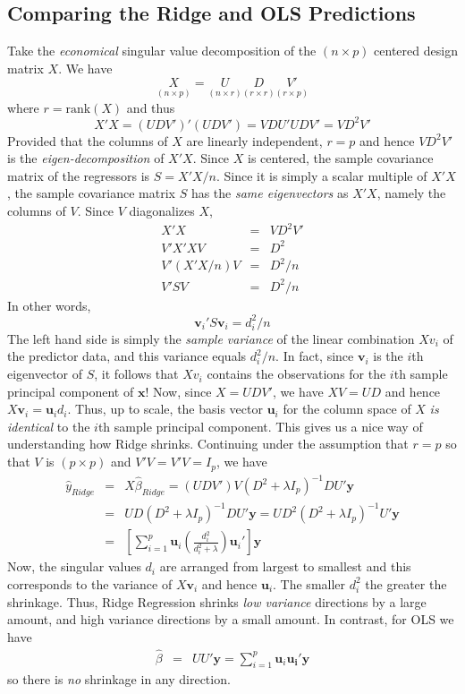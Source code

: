 \subsection{Comparing the Ridge and OLS Predictions}

Take the \emph{economical} singular value decomposition of the $(n\times p)$ centered  design matrix $X$. We have
	$$\underset{(n\times p)}{X} = \underset{(n\times r)}{U} \underset{(r\times r)}{D} \underset{(r\times p)}{V'}$$
where $r = \mbox{rank}(X)$ and thus
	$$X'X = (UDV')'(UDV') = VDU'UDV' = VD^2V'$$
Provided that the columns of $X$ are linearly independent, $r = p$ and hence $VD^2 V'$ is the \emph{eigen-decomposition} of $X'X$. Since $X$ is centered, the sample covariance matrix of the regressors is $S = X'X/n$. Since it is simply a scalar multiple of $X'X$, the sample covariance matrix $S$ has the \emph{same eigenvectors} as $X'X$, namely the columns of $V$. Since $V$ diagonalizes $X$,
	\begin{eqnarray*}
		X'X &=& VD^2 V'\\
		V'X'X V &=& D^2\\
		V' (X'X/n)V &=& D^2/n\\
		V' S V &=& D^2/n
	\end{eqnarray*}
In other words,
	$$\textbf{v}_i' S \textbf{v}_i = d_i^2/n$$
The left hand side is simply the \emph{sample variance} of the linear combination $X v_i$ of the predictor data, and this variance equals $d_i^2/n$. In fact, since $\mathbf{v}_i$ is the $i$th eigenvector of $S$, it follows that $X v_i$ contains the observations for the $i$th sample principal component of $\mathbf{x}$! Now, since $X = UDV'$, we have $XV = UD$ and hence $X \mathbf{v}_i = \mathbf{u}_i d_i$. Thus, up to scale, the basis vector $\mathbf{u}_i$ for the column space of $X$ \emph{is identical} to the $i$th sample principal component. This gives us a nice way of understanding how Ridge shrinks. Continuing under the assumption that $r = p$ so that $V$ is $(p\times p)$ and $V'V = V'V = I_p$, we have
\begin{eqnarray*}
	\widehat{y}_{Ridge} &=& X\widehat{\beta}_{Ridge} = (UDV')V(D^2 + \lambda I_p)^{-1}DU'\mathbf{y}\\
	&=& UD(D^2 + \lambda I_p)^{-1}DU'\mathbf{y} = UD^2(D^2 + \lambda I_p)^{-1}U'\mathbf{y}\\
	&=&\left[\sum_{i=1}^p \mathbf{u}_i \left(\frac{d_i^2}{d_i^2 +\lambda}\right)\mathbf{u}_i' \right] \mathbf{y}
\end{eqnarray*}
Now, the singular values $d_i$ are arranged from largest to smallest and this corresponds to the variance of $X \mathbf{v}_i$ and hence $\mathbf{u}_i$. The smaller $d_i^2$ the greater the shrinkage. Thus, Ridge Regression shrinks \emph{low variance} directions by a large amount, and high variance directions by a small amount. In contrast, for OLS we have 
	\begin{eqnarray*}
		\widehat{\beta} &=& UU'\mathbf{y} = \sum_{i=1}^p \mathbf{u}_i \mathbf{u_i}' \mathbf{y}
	\end{eqnarray*}
so there is \emph{no} shrinkage in any direction.

